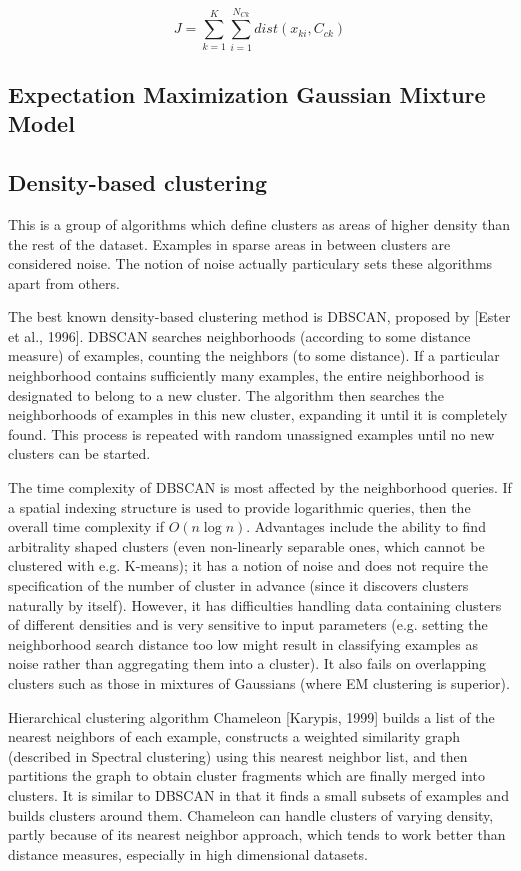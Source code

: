 \documentclass[conference]{IEEEtran}
\begin{document}
\begin{equation}\label{ECMJ}
J = \sum_{k=1}^K \sum_{i=1}^{N_{Ck}} dist(x_{ki}, C_{ck})
\end{equation}

\subsection{Expectation Maximization Gaussian Mixture Model}

\subsection{Density-based clustering}
This is a group of algorithms which define clusters as areas of higher density than the rest
of the dataset. Examples in sparse areas in between clusters are considered noise. The notion
of noise actually particulary sets these algorithms apart from others.

The best known density-based clustering method is DBSCAN, proposed by [Ester et al., 1996].
DBSCAN searches neighborhoods (according to some distance measure) of examples,
counting the neighbors (to some distance). If a
particular neighborhood contains sufficiently many examples, the entire neighborhood is
designated to belong to a new cluster. The algorithm then searches the neighborhoods of examples
in this new cluster, expanding it until it is completely found.
This process is repeated with random unassigned examples until no new clusters can be started.

The time complexity of DBSCAN is most affected by the neighborhood queries. If a spatial
indexing structure is used to provide logarithmic queries, then the overall time complexity
if $O(n\log n)$. Advantages include the ability to find arbitrality shaped clusters (even
non-linearly separable ones, which cannot be clustered with e.g. K-means); it has a notion of
noise and does not require the specification of the number of cluster in advance (since it
discovers clusters naturally by itself). However, it has difficulties handling data containing
clusters of different densities and is very sensitive to input parameters (e.g. setting
the neighborhood search distance too low might result in classifying examples as noise
rather than aggregating them into a cluster). It also fails on overlapping clusters such as
those in mixtures of Gaussians (where EM clustering is superior).

Hierarchical clustering algorithm Chameleon [Karypis, 1999] builds a list of the nearest
neighbors of each example, constructs a weighted similarity graph (described in Spectral clustering)
using this nearest neighbor list, and then partitions the graph to obtain cluster fragments
which are finally merged into clusters. It is similar to DBSCAN in that it finds a small subsets
of examples and builds clusters around them. Chameleon can handle clusters of varying density,
partly because of its nearest neighbor approach, which tends to work better than distance measures,
especially in high dimensional datasets.
\end{document}

